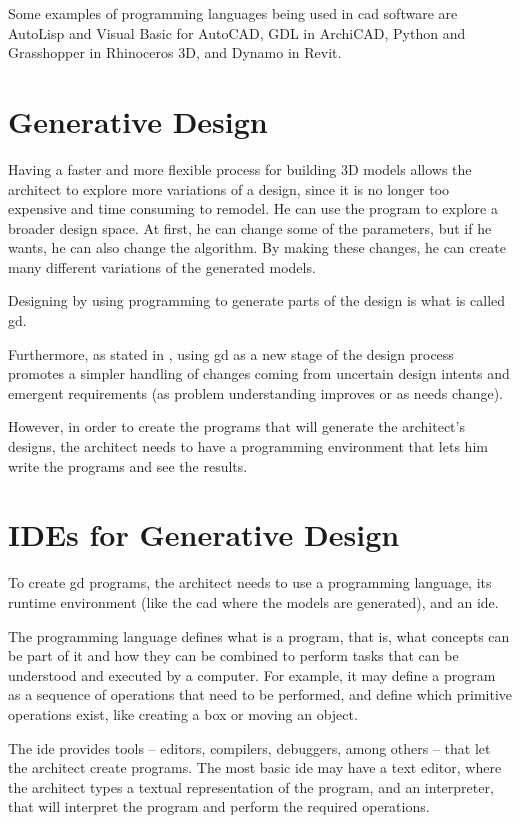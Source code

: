 Some examples of programming languages being used in \gls{cad} software are AutoLisp and Visual Basic for AutoCAD, GDL in ArchiCAD, Python and Grasshopper in Rhinoceros 3D, and Dynamo in Revit.


\section{Generative Design}
Having a faster and more flexible process for building 3D models allows the architect to explore more variations of a design, since it is no longer too expensive and time consuming to remodel.
He can use the program to explore a broader design space.
At first, he can change some of the parameters, but if he wants, he can also change the algorithm.
By making these changes, he can create many different variations of the generated models.

Designing by using programming to generate parts of the design is what is called \gls{gd}.

Furthermore, as stated in \cite{leitao2014pushing}, using \gls{gd} as a new stage of the design process promotes a simpler handling of changes coming from uncertain design intents and emergent requirements (as problem understanding improves or as needs change).


However, in order to create the programs that will generate the architect's designs, the architect needs to have a programming environment that lets him write the programs and see the results.


\section{IDEs for Generative Design}
To create \gls{gd} programs, the architect needs to use a programming language, its runtime environment (like the \gls{cad} where the models are generated), and an \gls{ide}.

The programming language defines what is a program, that is, what concepts can be part of it and how they can be combined to perform tasks that can be understood and executed by a computer.
For example, it may define a program as a sequence of operations that need to be performed, and define which primitive operations exist, like creating a box or moving an object.

The \gls{ide} provides tools -- editors, compilers, debuggers, among others -- that let the architect create programs.
The most basic \gls{ide} may have a text editor, where the architect types a textual representation of the program, and an interpreter, that will interpret the program and perform the required operations.

